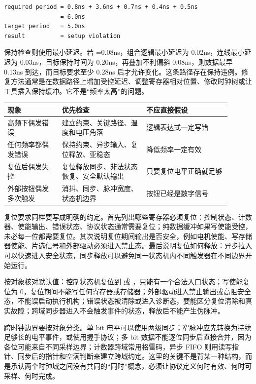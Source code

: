 \begin{lstlisting}
required period = 0.8ns + 3.6ns + 0.7ns + 0.4ns + 0.5ns
                = 6.0ns
target period   = 5.0ns
result          = setup violation
\end{lstlisting}

保持检查则使用最小延迟。若 =0.08ns，组合逻辑最小延迟为 0.02ns，连线最小延迟为 0.03ns，目标保持时间为 0.20ns，再叠加不利偏斜 0.08ns，则数据最早 0.13ns 到达，而目标要求至少 0.28ns 后才允许变化。这条路径存在保持违例。修复方法通常是在数据路径上增加受控延迟、调整寄存器相对位置、修改时钟树或让工具插入保持缓冲。它不是“频率太高”的问题。

\begin{longtable}{L{0.22\linewidth}L{0.34\linewidth}L{0.34\linewidth}}
\toprule
现象 & 优先检查 & 不应直接假设 \\
\midrule
高频下偶发错误 & 建立约束、关键路径、温度和电压角落 & 逻辑表达式一定写错 \\
任何频率都偶发错误 & 保持约束、异步输入、复位释放、亚稳态 & 降低频率一定有效 \\
复位后偶发失控 & 复位释放同步、非法状态恢复、安全默认输出 & 只要复位电平正确就足够 \\
外部按钮偶发多次触发 & 消抖、同步、脉冲宽度、状态机边界 & 按钮已经是数字信号 \\
\bottomrule
\end{longtable}

复位要求同样要写成明确的约定。首先列出哪些寄存器必须复位：控制状态、计数器、使能输出、错误状态、协议状态通常需要复位；纯数据缓冲如果写使能受控，未必每一位都需要复位。其次说明复位期间输出是否安全，例如电机使能、写存储器使能、片选信号和外部驱动必须进入禁止态。最后说明复位如何释放：异步拉入可以快速进入安全状态，同步释放可以避免同一状态机内不同触发器在不同边界开始运行。

按对象核对默认值：控制状态机复位到  或 ，只能有一个合法入口状态；写使能复位为 0，复位期间不能写任何寄存器或存储器；外部驱动进入禁止输出或高阻安全态，不能误启动执行机构；错误状态被清除或进入诊断态，要能区分复位清除和真实故障；跨域同步器进入不会触发事件的状态，释放后不能产生伪脉冲。

跨时钟边界要按对象分类。单 bit 电平可以使用两级同步；窄脉冲应先转换为持续足够长的电平事件，或使用握手协议；多 bit 数据不能逐位同步后直接合并，因为各位可能来自不同采样边界；计数器跨域常用格雷码，异步 FIFO 则用读写指针、同步后的指针和空满判断来建立跨域约定。这里的关键不是背某一种结构，而是承认两个时钟域之间没有共同的“同时”概念，必须让协议定义何时有效、何时可采样、何时完成。

